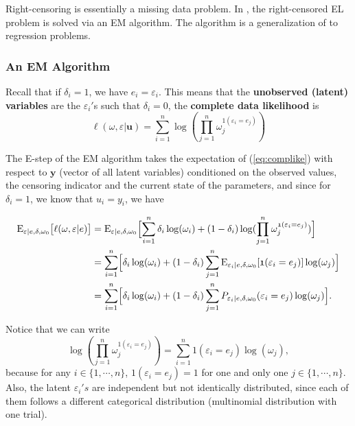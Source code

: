 \documentclass[article]{jss}
\newcommand{\yy}{\bm y}
\newcommand{\uu}{\bm u}
\newcommand{\w}{\omega}
\renewcommand{\E}{\textrm{E}}
\newcommand{\e}{\varepsilon}
\renewcommand{\|}{\,|\,}
\begin{document}
Right-censoring is essentially a missing data problem. In , the right-censored EL problem is solved via an EM algorithm. The algorithm is a generalization of \citet{zhou2005} to regression problems.

\hypertarget{an-em-algorithm}{%
\subsubsection{An EM Algorithm}\label{an-em-algorithm}}

Recall that if \(\delta_i=1\), we have \(e_i=\e_i\). This means that the \textbf{unobserved (latent) variables} are the \(\e_i'\)s such that \(\delta_i = 0\), the \textbf{complete data likelihood} is
\begin{equation}\label{eq:complike}
  \ell(\w,\e|\uu) = \sum_{i=1}^n\log(\prod_{j=1}^n \w_j^{\mathfrak 1(\e_i=e_j)})
\end{equation}

The E-step of the EM algorithm takes the expectation of (\ref{eq:complike}) with respect to \(\yy\) (vector of all latent variables) conditioned on the observed values, the censoring indicator and the current state of the parameters, and since for \(\delta_i = 1\), we know that \(u_i=y_i\), we have

\begin{equation}\label{eq:estep}
\begin{split}
  \E_{\e|e,\delta,\w_0}\bigl[\ell(\w,\e|e)\bigr]
  &= \E_{\e|e,\delta,\w_0}\Bigl[\sum_{i=1}^n\delta_i\log(\w_i) +
  (1-\delta_i)\log(\prod_{j=1}^n \w_j^{\mathfrak 1(\e_i=e_j)})\Bigr] \\
  &= \sum_{i=1}^n\Bigl[\delta_i\log(\w_i) +
  (1-\delta_i)\sum_{j=1}^n \E_{\e_i|e,\delta,\w_0}[\mathfrak1(\e_i=e_j)]\log(\w_j)\Bigr] \\
  &= \sum_{i=1}^n\Bigl[\delta_i\log(\w_i) +
  (1-\delta_i)\sum_{j=1}^n P_{\e_i|e,\delta,\w_0}(\e_i=e_j)\log(\w_j)\Bigr].
\end{split}
\end{equation}

Notice that we can write
\[
  \log(\prod_{j=1}^n \w_j^{\mathfrak 1(\e_i=e_j)}) =
  \sum_{i=1}^n \mathfrak 1(\e_i=e_j)\log(\w_j),
\]
because for any \(i \in \{1,\cdots,n\}\), \(\mathfrak 1(\e_i=e_j)=1\) for one and only one \(j\in\{1,\cdots,n\}\). Also, the latent \(\e_i's\) are independent but not identically distributed, since each of them follows a different categorical distribution (multinomial distribution with one trial).
\end{document}
